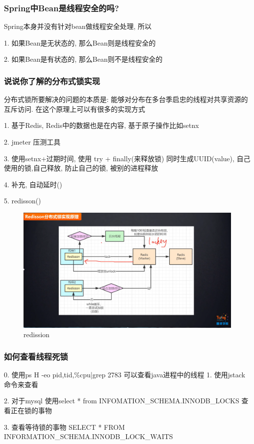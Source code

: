 \documentclass[UTF8]{ctexart}
\begin{document}
\subsubsection{Spring中Bean是线程安全的吗?}
Spring本身并没有针对bean做线程安全处理, 所以 \par
1. 如果Bean是无状态的, 那么Bean则是线程安全的 \par
2. 如果Bean是有状态的, 那么Bean则不是线程安全的

\subsubsection{说说你了解的分布式锁实现}
分布式锁所要解决的问题的本质是: 能够对分布在多台季启忠的线程对共享资源的互斥访问. 在这个原理上可以有很多的实现方式 \par
1. 基于Redis, Redis中的数据也是在内容, 基于原子操作比如setnx \par
2. jmeter 压测工具 \par
3. 使用setnx+过期时间, 使用 try + finally(来释放锁) 同时生成UUID(value), 自己使用的锁,自己释放, 防止自己的锁, 被别的进程释放 \par
4. 补充, 自动延时() \par
5. redisson() \par
\begin{figure}
	\centering
	\includegraphics[width=0.7\linewidth]{figures/redission.png}
	\caption{redission}
	\label{fig:redission}
\end{figure}
\subsubsection{如何查看线程死锁}
0. 使用ps H -eo pid,tid,\%cpu|grep 2783 可以查看java进程中的线程
1. 使用jstack命令来查看 \par
2. 对于mysql 使用select * from INFOMATION\_SCHEMA.INNODB\_LOCKS 查看正在锁的事物 \par
3. 查看等待锁的事物 SELECT * FROM INFORMATION\_SCHEMA.INNODB\_LOCK\_WAITS \par
\end{document}
